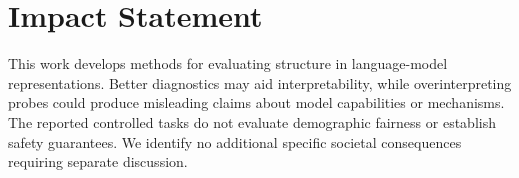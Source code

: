 \documentclass{article}
\begin{document}
\FloatBarrier
\label{sec:main-end}

\section*{Impact Statement}
This work develops methods for evaluating structure in language-model representations. Better diagnostics may aid interpretability, while overinterpreting probes could produce misleading claims about model capabilities or mechanisms. The reported controlled tasks do not evaluate demographic fairness or establish safety guarantees. We identify no additional specific societal consequences requiring separate discussion.



\appendix
\onecolumn







\end{document}
